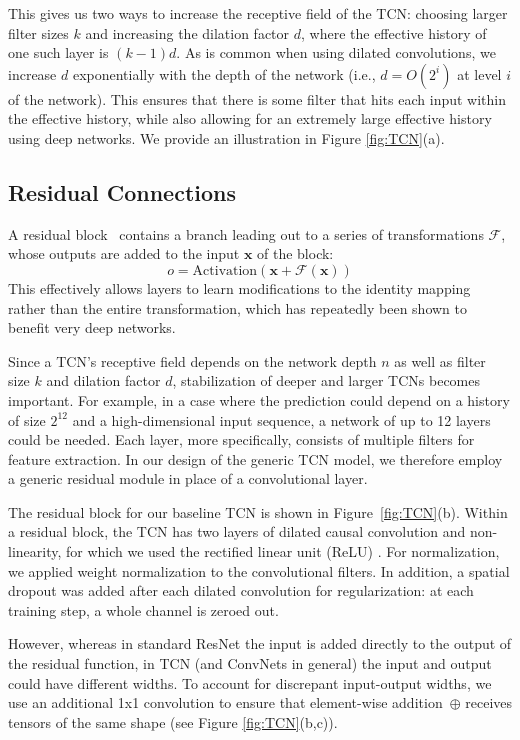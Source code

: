 \documentclass{article}
\begin{document}
This gives us two ways to increase the receptive field of the TCN: choosing
larger filter sizes $k$ and increasing the dilation factor $d$, where the
effective history of one such layer is $(k-1)d$.  As is common when using dilated
convolutions, we increase $d$ exponentially with the depth of the
network (i.e., $d = O(2^i)$ at level $i$ of the network). This ensures
that there is some filter that hits each input within the effective history, while
also allowing for an extremely large effective history using deep networks.  We
provide an illustration in Figure \ref{fig:TCN}(a).


\subsection{Residual Connections}

A residual block~\cite{he2016deep} contains a branch leading out to a series of
transformations $\mathcal{F}$, whose outputs are added to the input $\mathbf{x}$
of the block:
\begin{equation}
o = \text{Activation}(\mathbf{x} + \mathcal{F}(\mathbf{x}))
\end{equation}
This effectively allows layers to learn modifications to the identity
mapping rather than the entire transformation, which has repeatedly been shown
to benefit very deep networks.

Since a TCN's receptive field depends on the network depth $n$ as well
as filter size $k$ and dilation factor $d$, stabilization of deeper and larger TCNs
becomes important. For example, in a case where the prediction could depend on
a history of size $2^{12}$ and a high-dimensional input sequence, a network of
up to 12 layers could be needed. Each layer, more specifically, consists of
multiple filters for feature extraction. In our design of the generic TCN model,
we therefore employ a generic residual module in place of a convolutional layer.

The residual block for our baseline TCN is shown in Figure~\ref{fig:TCN}(b).
Within a residual block, the TCN has two layers of dilated causal convolution
and non-linearity, for which we used the rectified linear unit (ReLU)
\citep{nair2010rectified}. For normalization, we applied
weight normalization \citep{Salimans2016} to the convolutional filters.
In addition, a spatial dropout \citep{srivastava2014dropout} was added after each
dilated convolution for regularization: at each training step, a whole channel is
zeroed out.

However, whereas in standard ResNet the input is added directly
to the output of the residual function, in TCN (and ConvNets in general) the
input and output could have different widths. To account for discrepant input-output
widths, we use an additional 1x1 convolution to ensure
that element-wise addition~$\oplus$ receives tensors of the same shape (see Figure
\ref{fig:TCN}(b,c)).
\end{document}
